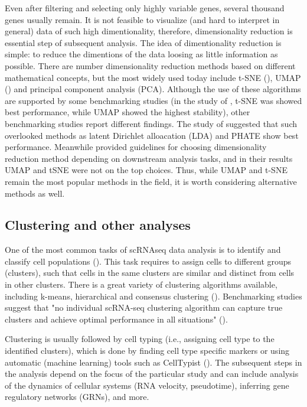 Even after filtering and selecting only highly variable genes, several thousand genes usually remain.
It is not feasible to visualize (and hard to interpret in general) data of such high dimentionality, therefore,
dimensionality reduction is essential step of subsequent analysis.
The idea of dimentionality reduction is simple:
to reduce the dimentions of the data loosing as little information as possible.
There are number dimensionality reduction methods based on different mathematical concepts,
but the most widely used today include
t-SNE (\cite{Hinton2002}), UMAP (\cite{McInnes2018}) and principal component analysis (PCA).
Although the use of these algorithms are supported by some benchmarking studies
(in the study of \textcite{Xiang2021}, t-SNE was showed best performance, while UMAP showed the highest stability),
other benchmarking studies report different findings.
The study of \textcite{Koch2021} suggested that such overlooked methods as
latent Dirichlet alloacation (LDA) and PHATE show best performance.
Meanwhile \textcite{Sun2019} provided guidelines for choosing dimensionality reduction method
depending on downstream analysis tasks, and in their results UMAP and tSNE were not on the top choices.
Thus, while UMAP and t-SNE remain the most popular methods in the field,
it is worth considering alternative methods as well.

\subsection{Clustering and other analyses}

One of the most common tasks of scRNAseq data analysis is to identify and classify cell populations (\cite{Andrews2018}).
This task requires to assign cells to different groups (clusters),
such that cells in the same clusters are similar and distinct from cells in other clusters.
There is a great variety of clustering algorithms available,
including k-means, hierarchical and consensus clustering (\cite{Peng2020}).
Benchmarking studies suggest that "no individual scRNA-seq clustering algorithm can capture true clusters and achieve
optimal performance in all situations" (\cite{Peng2020}).

Clustering is usually followed by cell typing (i.e., assigning cell type to the identified clusters),
which is done by finding cell type specific markers
or using automatic (machine learning) tools such as CellTypist (\cite{Dom2022}).
The subsequent steps in the analysis depend on the focus of the particular study and can include
analysis of the dynamics of cellular systems (RNA velocity, pseudotime),
inferring gene regulatory networks (GRNs), and more.

